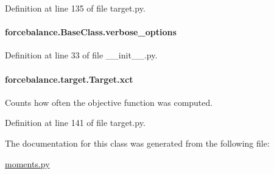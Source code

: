 Definition at line 135 of file target.\-py.

\hypertarget{classforcebalance_1_1BaseClass_afd68efa29ccd2f320f4cf82198214aac}{
\paragraph[{verbose\-\_\-options}]{\setlength{\rightskip}{0pt plus 5cm}forcebalance.\-Base\-Class.\-verbose\-\_\-options\hspace{0.3cm}{\ttfamily [inherited]}}}\label{classforcebalance_1_1BaseClass_afd68efa29ccd2f320f4cf82198214aac}


Definition at line 33 of file \-\_\-\-\_\-init\-\_\-\-\_\-.\-py.

\hypertarget{classforcebalance_1_1target_1_1Target_aad2e385cfbf7b4a68f1c2cb41133fe82}{
\paragraph[{xct}]{\setlength{\rightskip}{0pt plus 5cm}forcebalance.\-target.\-Target.\-xct\hspace{0.3cm}{\ttfamily [inherited]}}}\label{classforcebalance_1_1target_1_1Target_aad2e385cfbf7b4a68f1c2cb41133fe82}


Counts how often the objective function was computed. 



Definition at line 141 of file target.\-py.



The documentation for this class was generated from the following file\-:\begin{DoxyCompactItemize}
\item 
\hyperlink{moments_8py}{moments.\-py}\end{DoxyCompactItemize}
